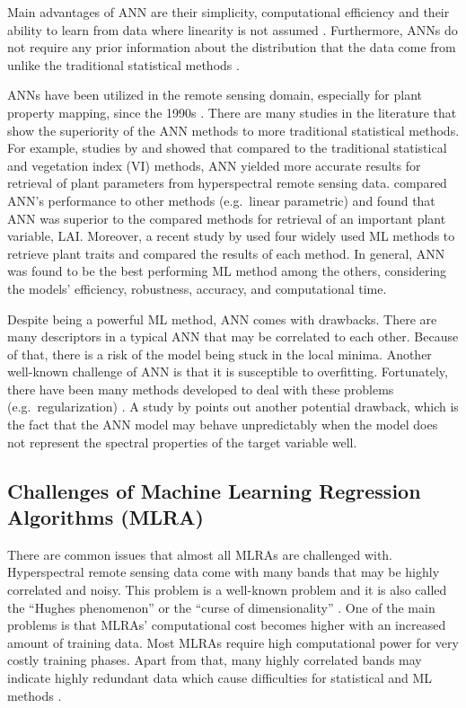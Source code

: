\documentclass[a4paper, twoside]{templates/ociamthesis}
\begin{document}
Main advantages of ANN are their simplicity, computational efficiency and their ability to learn from data where linearity is not assumed \citep{schlerf2006inversion, walczak2019artificial}. Furthermore, ANNs do not require any prior information about the distribution that the data come from unlike the traditional statistical methods \citep{walczak2019artificial}.

ANNs have been utilized in the remote sensing domain, especially for plant property mapping, since the 1990s \citep{verrelst2019quantifying}. There are many studies in the literature that show the superiority of the ANN methods to more traditional statistical methods. For example, studies by \citet{malenovsky2013retrieval} and \citet{kalacska2015estimation} showed that compared to the traditional statistical and vegetation index (VI) methods, ANN yielded more accurate results for retrieval of plant parameters from hyperspectral remote sensing data. \citet{neinavaz2016retrieval} compared ANN's performance to other methods (e.g.~linear parametric) and found that ANN was superior to the compared methods for retrieval of an important plant variable, LAI. Moreover, a recent study by \citet{danner2021efficient} used four widely used ML methods to retrieve plant traits and compared the results of each method. In general, ANN was found to be the best performing ML method among the others, considering the models' efficiency, robustness, accuracy, and computational time.

Despite being a powerful ML method, ANN comes with drawbacks. There are many descriptors in a typical ANN that may be correlated to each other. Because of that, there is a risk of the model being stuck in the local minima. Another well-known challenge of ANN is that it is susceptible to overfitting. Fortunately, there have been many methods developed to deal with these problems (e.g.~regularization) \citep{ghasemi2018neural}. A study by \citet{schlerf2006inversion} points out another potential drawback, which is the fact that the ANN model may behave unpredictably when the model does not represent the spectral properties of the target variable well.

\hypertarget{chml}{%
\subsection{Challenges of Machine Learning Regression Algorithms (MLRA)}\label{chml}}

There are common issues that almost all MLRAs are challenged with. Hyperspectral remote sensing data come with many bands that may be highly correlated and noisy. This problem is a well-known problem and it is also called the ``Hughes phenomenon'' \citep{hughes1968mean} or the ``curse of dimensionality'' \citep{danner2021efficient}. One of the main problems is that MLRAs' computational cost becomes higher with an increased amount of training data. Most MLRAs require high computational power for very costly training phases. Apart from that, many highly correlated bands may indicate highly redundant data which cause difficulties for statistical and ML methods \citep{rivera2017hyperspectral}.
\end{document}
